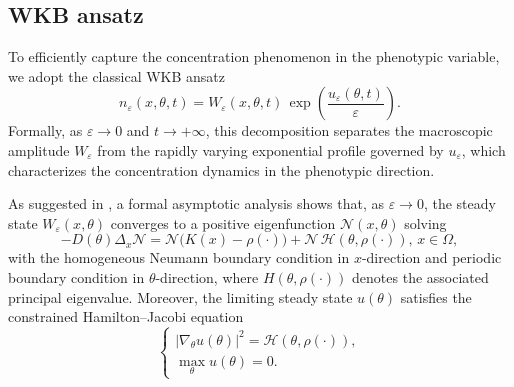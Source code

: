 \documentclass[11pt, dina4, amsfont12]{article}
\begin{document}
\subsection{WKB ansatz}
To efficiently capture the concentration phenomenon in the phenotypic variable, we adopt the classical WKB ansatz
\begin{equation}\label{eq:WKB}
   n_\varepsilon(x,\theta,t)
   = W_\varepsilon(x,\theta,t)\,
   \exp\!\left(\frac{u_\varepsilon(\theta,t)}{\varepsilon}\right).
\end{equation}
Formally, as $\varepsilon \to 0$ and $t \to +\infty$, this decomposition separates the macroscopic amplitude $W_\varepsilon$ from the rapidly varying exponential profile governed by $u_\varepsilon$, which characterizes the concentration dynamics in the phenotypic direction.

As suggested in \cite{XXX}, a formal asymptotic analysis shows that, as $\varepsilon \to 0$, 
the steady state $W_\varepsilon(x,\theta)$ converges to a positive eigenfunction 
$\mathcal{N}(x,\theta)$ solving
\begin{equation}\label{eq:eigen_N}
    -D(\theta)\Delta_x \mathcal{N}
    = \mathcal{N}\bigl(K(x)-\rho(\cdot)\bigr)
    + \mathcal{N}\, \mathcal{H}(\theta,\rho(\cdot)), 
    \, x \in \Omega, 
\end{equation}
with the homogeneous Neumann boundary condition in $x$-direction and periodic boundary condition in $\theta$-direction, where $H(\theta,\rho(\cdot))$ denotes the associated principal eigenvalue.
Moreover, the limiting steady state $u(\theta)$ satisfies the constrained
Hamilton--Jacobi equation
\begin{equation}\label{eq:HJ_limit}
\begin{cases}
    |\nabla_\theta u(\theta)|^2 = \mathcal{H}(\theta,\rho(\cdot)), \\[1mm]
    \displaystyle \max_{\theta} u(\theta) = 0.
\end{cases}
\end{equation}
\end{document}
